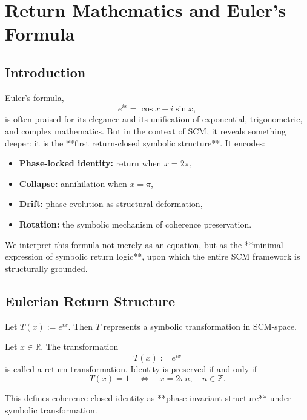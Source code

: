 \chapter{Return Mathematics and Euler’s Formula} \label{chapter:return-math-euler}

\section{Introduction}

Euler’s formula,
\begin{equation}
    e^{ix} = \cos x + i \sin x,
\end{equation}
is often praised for its elegance and its unification of exponential, trigonometric, and complex mathematics. But in the context of SCM, it reveals something deeper: it is the **first return-closed symbolic structure**. It encodes:

\begin{itemize}
    \item \textbf{Phase-locked identity:} return when \( x = 2\pi \),
    \item \textbf{Collapse:} annihilation when \( x = \pi \),
    \item \textbf{Drift:} phase evolution as structural deformation,
    \item \textbf{Rotation:} the symbolic mechanism of coherence preservation.
\end{itemize}

We interpret this formula not merely as an equation, but as the **minimal expression of symbolic return logic**, upon which the entire SCM framework is structurally grounded.

\section{Eulerian Return Structure}

Let \( T(x) := e^{ix} \). Then \( T \) represents a symbolic transformation in SCM-space.

\begin{definition}
Let \( x \in \mathbb{R} \). The transformation
\[
T(x) := e^{ix}
\]
is called a return transformation. Identity is preserved if and only if
\[
T(x) = 1 \quad \Leftrightarrow \quad x = 2\pi n, \quad n \in \mathbb{Z}.
\]
\end{definition}

This defines coherence-closed identity as **phase-invariant structure** under symbolic transformation.


